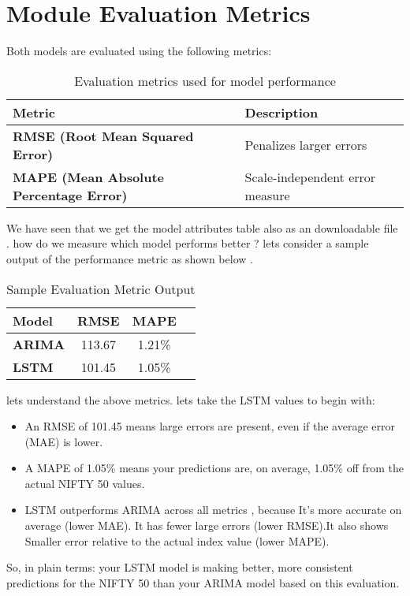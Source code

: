 %
%

\chapter{Module Evaluation Metrics}

Both models are evaluated using the following metrics:

\begin{table}[h!]
	\centering
	\begin{tabular}{|l|p{6cm}|}
		\hline
		\textbf{Metric} & \textbf{Description} \\
		\hline
		\textbf{RMSE (Root Mean Squared Error)} & Penalizes larger errors \\
		\hline
		\textbf{MAPE (Mean Absolute Percentage Error)} & Scale-independent error measure \\
		\hline
	\end{tabular}
	\caption{Evaluation metrics used for model performance}
	\label{tab:evaluation_metrics}
\end{table}

 We have seen that we get the model attributes table also as an downloadable file . how do we measure which model performs better ? lets consider a sample output of the performance metric as shown below .

\begin{table}[h!]
	\centering
	\begin{tabular}{|l|c|c|c|}
		\hline
		\textbf{Model} & \textbf{RMSE} & \textbf{MAPE} \\
		\hline
		\textbf{ARIMA} & 113.67 & 1.21\% \\
		\hline
		\textbf{LSTM}  & 101.45 & 1.05\% \\
		\hline
	\end{tabular}
	\caption{Sample Evaluation Metric Output}
	\label{tab:Sameple_Evaluation_Metric_Output}
\end{table}

lets understand the above metrics. lets take the LSTM values to begin with:

\begin{itemize}
	\item An RMSE of 101.45 means large errors are present, even if the average error (MAE) is lower.
	\item A MAPE of 1.05\% means your predictions are, on average, 1.05\% off from the actual NIFTY 50 values.
	\item LSTM outperforms ARIMA across all metrics , because It's more accurate on average (lower MAE). It has fewer large errors (lower RMSE).It also shows Smaller error relative to the actual index value (lower MAPE).
\end{itemize}

So, in plain terms: your LSTM model is making better, more consistent predictions for the NIFTY 50 than your ARIMA model based on this evaluation.


